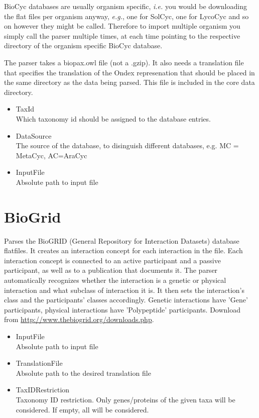 BioCyc databases are usually organism specific, {\it{i.e.}} you would be downloading the flat files per organism anyway, 
{\it{e.g.}}, one for SolCyc, one for LycoCyc and so on however they might be called. 
Therefore to import multiple organism you simply call the parser multiple times, 
at each time pointing to the respective directory of the organism specific BioCyc database.    
    
The parser takes a biopax.owl file (not a .gzip).
It also needs a translation file that specifies the translation of the Ondex represenation 
that should be placed in the same directory as the data being parsed.
This file is included in the core data directory.    

\begin{itemize}
  \item{TaxId}\\
  Which taxonomy id should be assigned to the database entries.
  \item{DataSource}\\
  The source of the database, to disinguish different databases, e.g. MC = MetaCyc, AC=AraCyc
  \item{InputFile}\\
  Absolute path to input file
\end{itemize}


\section{BioGrid}
Parses the BioGRID (General Repository for Interaction Datasets) database flatfiles.
It creates an interaction concept for each interaction in the file. 
Each interaction concept is connected to an active participant and a passive participant, 
as well as to a publication that documents it.
The parser automatically recognizes whether the interaction is a genetic or physical interaction 
and what subclass of interaction it is. It then sets the interaction's class and the 
participants' classes accordingly. Genetic interactions have 'Gene' participants, 
physical interactions have 'Polypeptide' participants.
Download from \url{http://www.thebiogrid.org/downloads.php}.

\begin{itemize}
  \item{InputFile}\\
  Absolute path to input file
  \item{TranslationFile}\\
  Absolute path to the desired translation file
  \item{TaxIDRestriction}\\
  Taxonomy ID restriction. Only genes/proteins of the given taxa will be considered. If empty, all will be considered.
\end{itemize}
    
